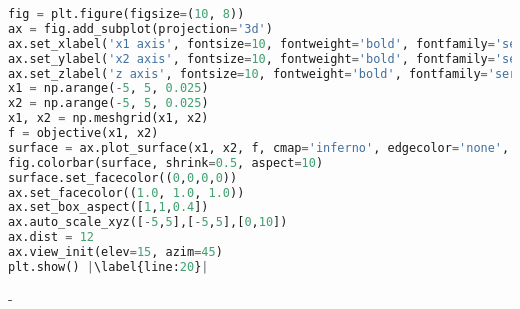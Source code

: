 \begin{lstlisting}[language=Python, label={lst:code5}, mathescape=true, breaklines=true, escapechar=|]
fig = plt.figure(figsize=(10, 8))
ax = fig.add_subplot(projection='3d')
ax.set_xlabel('x1 axis', fontsize=10, fontweight='bold', fontfamily='serif')
ax.set_ylabel('x2 axis', fontsize=10, fontweight='bold', fontfamily='serif')
ax.set_zlabel('z axis', fontsize=10, fontweight='bold', fontfamily='serif')
x1 = np.arange(-5, 5, 0.025)
x2 = np.arange(-5, 5, 0.025)
x1, x2 = np.meshgrid(x1, x2)
f = objective(x1, x2)
surface = ax.plot_surface(x1, x2, f, cmap='inferno', edgecolor='none', alpha=0.8)
fig.colorbar(surface, shrink=0.5, aspect=10)
surface.set_facecolor((0,0,0,0))
ax.set_facecolor((1.0, 1.0, 1.0))
ax.set_box_aspect([1,1,0.4])
ax.auto_scale_xyz([-5,5],[-5,5],[0,10])
ax.dist = 12
ax.view_init(elev=15, azim=45)
plt.show() |\label{line:20}|
\end{lstlisting}



















-











